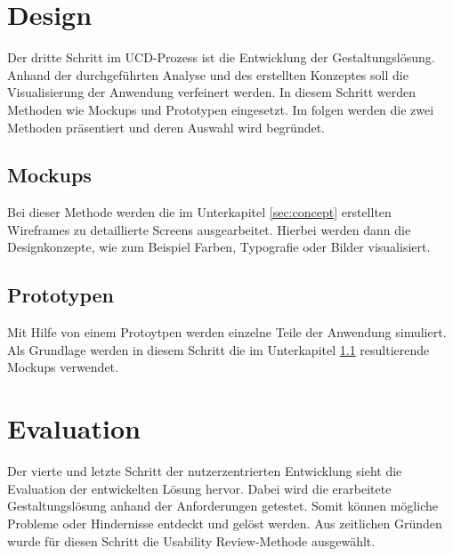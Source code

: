 \section{Design}

Der dritte Schritt im \ac{UCD}-Prozess ist die Entwicklung der Gestaltungslösung.
Anhand der durchgeführten Analyse und des erstellten Konzeptes soll die Visualisierung der Anwendung verfeinert werden.
In diesem Schritt werden Methoden wie Mockups und Prototypen eingesetzt.
Im folgen werden die zwei Methoden präsentiert und deren Auswahl wird begründet.

\subsection{Mockups}\label{sec:mockup}

Bei dieser Methode werden die im Unterkapitel \ref{sec:concept} erstellten Wireframes zu detaillierte Screens ausgearbeitet.
Hierbei werden dann die Designkonzepte, wie zum Beispiel Farben, Typografie oder Bilder visualisiert.

\subsection{Prototypen}

Mit Hilfe von einem Protoytpen werden einzelne Teile der Anwendung simuliert.
Als Grundlage werden in diesem Schritt die im Unterkapitel \ref{sec:mockup} resultierende Mockups verwendet.

\section{Evaluation}

Der vierte und letzte Schritt der nutzerzentrierten Entwicklung sieht die Evaluation der entwickelten Lösung hervor.
Dabei wird die erarbeitete Gestaltungslösung anhand der Anforderungen getestet.
Somit können mögliche Probleme oder Hindernisse entdeckt und gelöst werden.
Aus zeitlichen Gründen wurde für diesen Schritt die Usability Review-Methode ausgewählt.
